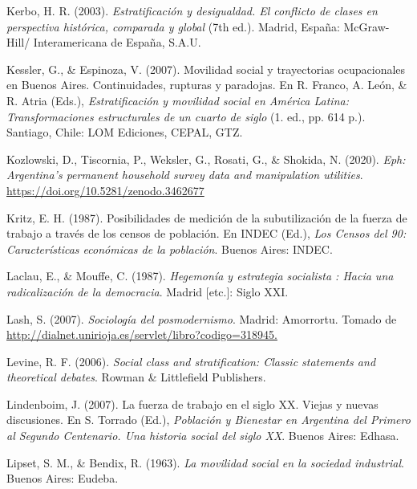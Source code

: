\documentclass[
]{article}
\newlength{\cslhangindent}
\newlength{\cslentryspacingunit} %
\newenvironment{CSLReferences}[2] %
 {%
  \setlength{\parindent}{0pt}
  \ifodd #1
  \let\oldpar\par
  \def\par{\hangindent=\cslhangindent\oldpar}
  \fi
  \setlength{\parskip}{#2\cslentryspacingunit}
 }%
 {}
\begin{document}
\begin{CSLReferences}{1}{0}
\leavevmode{}%
Kerbo, H. R. (2003). \emph{Estratificación y desigualdad. {El} conflicto de clases en perspectiva histórica, comparada y global} (7th ed.). Madrid, España: McGraw-Hill/ Interamericana de España, S.A.U.

\leavevmode{}%
Kessler, G., \& Espinoza, V. (2007). Movilidad social y trayectorias ocupacionales en {Buenos} {Aires}. {Continuidades}, rupturas y paradojas. En R. Franco, A. León, \& R. Atria (Eds.), \emph{Estratificación y movilidad social en {América} {Latina}: Transformaciones estructurales de un cuarto de siglo} (1. ed., pp. 614 p.). Santiago, Chile: LOM Ediciones, CEPAL, GTZ.

\leavevmode{}%
Kozlowski, D., Tiscornia, P., Weksler, G., Rosati, G., \& Shokida, N. (2020). \emph{Eph: Argentina's permanent household survey data and manipulation utilities}. \url{https://doi.org/10.5281/zenodo.3462677}

\leavevmode{}%
Kritz, E. H. (1987). Posibilidades de medición de la subutilización de la fuerza de trabajo a través de los censos de población. En INDEC (Ed.), \emph{Los {Censos} del 90: Características económicas de la población}. Buenos Aires: INDEC.

\leavevmode{}%
Laclau, E., \& Mouffe, C. (1987). \emph{Hegemonía y estrategia socialista : Hacia una radicalización de la democracia}. Madrid {[}etc.{]}: Siglo XXI.

\leavevmode{}%
Lash, S. (2007). \emph{Sociología del posmodernismo}. Madrid: Amorrortu. Tomado de \href{http://dialnet.unirioja.es/servlet/libro?codigo=318945}{http://dialnet.unirioja.es/servlet/libro?codigo=318945.}

\leavevmode{}%
Levine, R. F. (2006). \emph{Social class and stratification: Classic statements and theoretical debates}. Rowman \& Littlefield Publishers.

\leavevmode{}%
Lindenboim, J. (2007). La fuerza de trabajo en el siglo {XX}. {Viejas} y nuevas discusiones. En S. Torrado (Ed.), \emph{Población y {Bienestar} en {Argentina} del {Primero} al {Segundo} {Centenario}. {Una} historia social del siglo {XX}}. Buenos Aires: Edhasa.

\leavevmode{}%
Lipset, S. M., \& Bendix, R. (1963). \emph{La movilidad social en la sociedad industrial}. Buenos Aires: Eudeba.


\end{CSLReferences}
\end{document}

